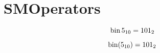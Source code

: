 \documentclass[class=scrartcl,crop=false]{standalone}
\begin{document}
\section{SMOperators}

\[
    \operatorname{bin} 5_{10} = 101_2
\]

\[
    \operatorname{bin} ( 5_{10} ) = 101_2
\]
\end{document}
